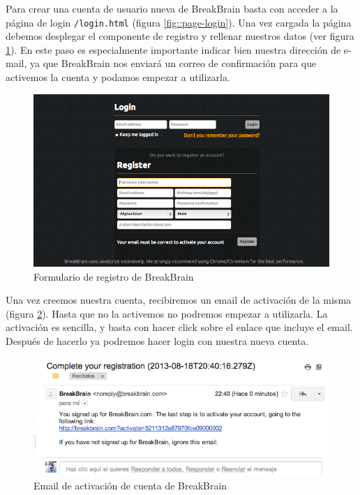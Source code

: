 Para crear una cuenta de usuario nueva de BreakBrain basta con acceder a la página de login {\tt /login.html} (figura \ref{fig::page-login}). Una vez cargada la página debemos desplegar el componente de registro y rellenar nuestros datos (ver figura \ref{fig::page-register}). En este paso es especialmente importante indicar bien nuestra dirección de e-mail, ya que BreakBrain nos enviará un correo de confirmación para que activemos la cuenta y podamos empezar a utilizarla.

\begin{figure}[h]
  \begin{center}
    \includegraphics[width=\textwidth]{./images/page-register.png}
  \end{center}  
  \caption{Formulario de registro de BreakBrain}
  \label{fig::page-register}
\end{figure}

Una vez creemos nuestra cuenta, recibiremos un email de activación de la misma (figura \ref{fig::register-email}). Hasta que no la activemos no podremos empezar a utilizarla. La activación es sencilla, y basta con hacer click sobre el enlace que incluye el email. Después de hacerlo ya podremos hacer login con nuestra nueva cuenta.

\begin{figure}[h]
  \begin{center}
    \includegraphics[width=\textwidth]{./images/register-email.png}
  \end{center}  
  \caption{Email de activación de cuenta de BreakBrain}
  \label{fig::register-email}
\end{figure}

